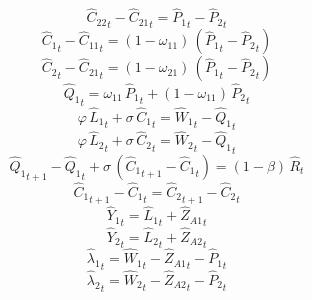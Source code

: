 \begin{dmath}
{{\hat{C}_{2 2}}}_{t}-{{\hat{C}_{2 1}}}_{t}={{\hat{P}_{1}}}_{t}-{{\hat{P}_{2}}}_{t}
\end{dmath}
\begin{dmath}
{{\hat{C}_{1}}}_{t}-{{\hat{C}_{1 1}}}_{t}=\left(1-{{\omega_{11}}}\right)\, \left({{\hat{P}_{1}}}_{t}-{{\hat{P}_{2}}}_{t}\right)
\end{dmath}
\begin{dmath}
{{\hat{C}_{2}}}_{t}-{{\hat{C}_{2 1}}}_{t}=\left(1-{{\omega_{21}}}\right)\, \left({{\hat{P}_{1}}}_{t}-{{\hat{P}_{2}}}_{t}\right)
\end{dmath}
\begin{dmath}
{{\hat{Q}_{1}}}_{t}={{\omega_{11}}}\, {{\hat{P}_{1}}}_{t}+\left(1-{{\omega_{11}}}\right)\, {{\hat{P}_{2}}}_{t}
\end{dmath}
\begin{dmath}
{{\varphi}}\, {{\hat{L}_{1}}}_{t}+{{\sigma}}\, {{\hat{C}_{1}}}_{t}={{\hat{W}_{1}}}_{t}-{{\hat{Q}_{1}}}_{t}
\end{dmath}
\begin{dmath}
{{\varphi}}\, {{\hat{L}_{2}}}_{t}+{{\sigma}}\, {{\hat{C}_{2}}}_{t}={{\hat{W}_{2}}}_{t}-{{\hat{Q}_{1}}}_{t}
\end{dmath}
\begin{dmath}
{{\hat{Q}_{1}}}_{t+1}-{{\hat{Q}_{1}}}_{t}+{{\sigma}}\, \left({{\hat{C}_{1}}}_{t+1}-{{\hat{C}_{1}}}_{t}\right)=\left(1-{{\beta}}\right)\, {{\hat{R}}}_{t}
\end{dmath}
\begin{dmath}
{{\hat{C}_{1}}}_{t+1}-{{\hat{C}_{1}}}_{t}={{\hat{C}_{2}}}_{t+1}-{{\hat{C}_{2}}}_{t}
\end{dmath}
\begin{dmath}
{{\hat{Y}_{1}}}_{t}={{\hat{L}_{1}}}_{t}+{{\hat{Z}_{A1}}}_{t}
\end{dmath}
\begin{dmath}
{{\hat{Y}_{2}}}_{t}={{\hat{L}_{2}}}_{t}+{{\hat{Z}_{A2}}}_{t}
\end{dmath}
\begin{dmath}
{{\hat{\lambda}_{1}}}_{t}={{\hat{W}_{1}}}_{t}-{{\hat{Z}_{A1}}}_{t}-{{\hat{P}_{1}}}_{t}
\end{dmath}
\begin{dmath}
{{\hat{\lambda}_{2}}}_{t}={{\hat{W}_{2}}}_{t}-{{\hat{Z}_{A2}}}_{t}-{{\hat{P}_{2}}}_{t}
\end{dmath}
